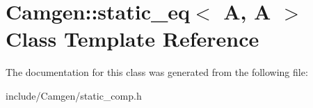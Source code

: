 \hypertarget{a00520}{}\section{Camgen\+:\+:static\+\_\+eq$<$ A, A $>$ Class Template Reference}
\label{a00520}


The documentation for this class was generated from the following file\+:\begin{DoxyCompactItemize}
\item 
include/\+Camgen/static\+\_\+comp.\+h\end{DoxyCompactItemize}
